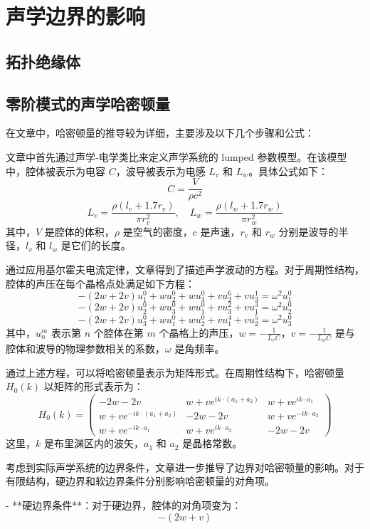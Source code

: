 \chapter{声学边界的影响}
\section{拓扑绝缘体}

\section{零阶模式的声学哈密顿量}

在文章中，哈密顿量的推导较为详细，主要涉及以下几个步骤和公式：

文章中首先通过声学-电学类比来定义声学系统的 lumped 参数模型。在该模型中，腔体被表示为电容 \( C \)，波导被表示为电感 \( L_v \) 和 \( L_w \)。具体公式如下：
\[
C = \frac{V}{\rho c^2}
\]
\[
L_v = \frac{\rho (l_v + 1.7r_v)}{\pi r_v^2}, \quad L_w = \frac{\rho (l_w + 1.7r_w)}{\pi r_w^2}
\]
其中，\( V \) 是腔体的体积，\( \rho \) 是空气的密度，\( c \) 是声速，\( r_v \) 和 \( r_w \) 分别是波导的半径，\( l_v \) 和 \( l_w \) 是它们的长度。


通过应用基尔霍夫电流定律，文章得到了描述声学波动的方程。对于周期性结构，腔体的声压在每个晶格点处满足如下方程：
\[
- (2w + 2v) u_1^0 + w u_2^0 + w u_3^0 + v u_2^6 + v u_3^1 = \omega^2 u_1^0
\]
\[
- (2w + 2v) u_2^0 + w u_3^0 + w u_1^0 + v u_3^2 + v u_1^3 = \omega^2 u_2^0
\]
\[
- (2w + 2v) u_3^0 + w u_1^0 + w u_2^0 + v u_1^4 + v u_2^5 = \omega^2 u_3^0
\]
其中，\( u_n^m \) 表示第 \( n \) 个腔体在第 \( m \) 个晶格上的声压，\( w = -\frac{1}{L_v C} \)，\( v = -\frac{1}{L_w C} \) 是与腔体和波导的物理参数相关的系数，\( \omega \) 是角频率。


通过上述方程，可以将哈密顿量表示为矩阵形式。在周期性结构下，哈密顿量 \( H_0(k) \) 以矩阵的形式表示为：
\[
H_0(k) =
\begin{pmatrix}
-2w - 2v & w + v e^{i k \cdot (a_1 + a_2)} & w + v e^{i k \cdot a_1} \\
w + v e^{-i k \cdot (a_1 + a_2)} & -2w - 2v & w + v e^{-i k \cdot a_2} \\
w + v e^{-i k \cdot a_1} & w + v e^{i k \cdot a_2} & -2w - 2v
\end{pmatrix}
\]
这里，\( k \) 是布里渊区内的波矢，\( a_1 \) 和 \( a_2 \) 是晶格常数。


考虑到实际声学系统的边界条件，文章进一步推导了边界对哈密顿量的影响。对于有限结构，硬边界和软边界条件分别影响哈密顿量的对角项。

- **硬边界条件**：对于硬边界，腔体的对角项变为：
  \[
  - (2w + v)
  \]
  
